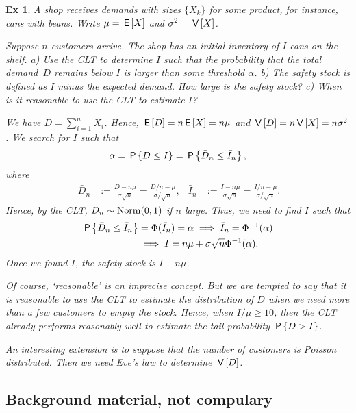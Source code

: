\documentclass[a4paper,11pt]{article}
\newtheorem{exercise}[theorem]{Ex}
\begin{document}
\begin{exercise}
A shop receives demands with sizes $\{X_{k}\}$ for some product, for instance, cans with beans.
Write $\mu = \E X$ and $\sigma^{2} = \V X$.

Suppose $n$ customers arrive.
The shop has an initial inventory of $I$ cans on the shelf.
a) Use the CLT to determine $I$ such that the probability that the total demand~$D$ remains below $I$ is larger than some threshold $\alpha$.
b) The safety stock is defined as $I$ minus the expected demand.
How large is the safety stock?
c) When is it reasonable to use the CLT to estimate $I$?
\begin{solution}
We have $D=\sum_{i=1}^{n} X_{i}$. Hence, $\E D = n \E X = n \mu$ and $\V D = n \V X = n \sigma^{2}$. We search for $I$ such that
\begin{equation}
  \label{eq:131}
\alpha = \P{D \leq I}   = \P{\bar D_n \leq \bar I_{n}},
\end{equation}
where
\begin{align}
  \label{eq:132}\
\bar D_{n} &:= \frac{D-n\mu}{\sigma \sqrt n}   = \frac{D/n - \mu}{\sigma/\sqrt n}, &
\bar I_{n} &:= \frac{I-n\mu}{\sigma \sqrt n}   = \frac{I/n - \mu}{\sigma/\sqrt n}.
\end{align}
Hence, by the CLT, $\bar D_{n}\sim \Norm{0, 1}$ if $n$ large. Thus, we need to find $I$ such that
\begin{align}
\P{\bar D_{n} \leq \bar I_{n}} &= \Phi(\bar I_{n}) = \alpha \implies \bar I_{n} = \Phi^{-1}(\alpha) \\
&\implies  I = n\mu + \sigma \sqrt n \Phi^{-1}(\alpha).
\end{align}
Once we found $I$, the safety stock is $I-n\mu$.

Of course, `reasonable' is an imprecise concept.
But we are tempted to say that it is reasonable to use the CLT to estimate the distribution of $D$ when we need more than a few customers to empty the stock.
Hence, when $I/\mu \geq 10$, then the CLT already performs reasonably well to estimate the tail probability $\P{D>I}$.

An interesting extension is to suppose that the number of customers is Poisson distributed. Then we need Eve's law to determine $\V D$.

\end{solution}
\end{exercise}



\subsection{Background material, not compulary}
\label{sec:backgr-mater-not}
\end{document}
